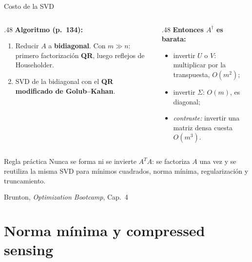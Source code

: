 \documentclass[10pt,aspectratio=169]{beamer}
\newcommand{\fuente}{\vfill{\scriptsize\color{gray}Brunton, \emph{Optimization Bootcamp}, Cap.~4}}
\begin{document}
\begin{frame}{Costo de la SVD}
  \small
  \begin{columns}[T,onlytextwidth]
    \begin{column}{.48\textwidth}
      \textbf{Algoritmo (p.~134):}
      \begin{enumerate}
        \item Reducir $A$ a \textbf{bidiagonal}. Con $m \gg n$: primero
          factorización \textbf{QR}, luego reflejos de Householder.
        \item SVD de la bidiagonal con el \textbf{QR modificado de
          Golub--Kahan}.
      \end{enumerate}
    \end{column}
    \begin{column}{.48\textwidth}
      \textbf{Entonces $A^{\dagger}$ es barata:}
      \begin{itemize}
        \item invertir $U$ o $V$: multiplicar por la transpuesta,
          $O(m^2)$;
        \item invertir $\Sigma$: $O(m)$, es diagonal;
        \item \emph{contraste:} invertir una matriz densa cuesta $O(m^3)$.
      \end{itemize}
    \end{column}
  \end{columns}

  \vspace{2mm}
  \begin{block}{Regla práctica}
    \scriptsize
    Nunca se forma ni se invierte $A^TA$: se factoriza $A$ una vez y se
    reutiliza la misma SVD para mínimos cuadrados, norma mínima,
    regularización y truncamiento.
  \end{block}
  \fuente
\end{frame}

\section{Norma mínima y compressed sensing}
\end{document}
